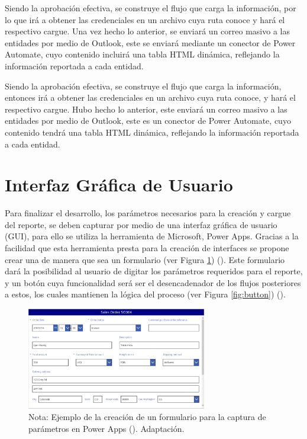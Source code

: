 \documentclass[letter,oneside,12pt,spanish]{report}
\begin{document}
\noindent Siendo la aprobación efectiva, se construye el flujo que carga la información, por lo que irá a obtener las credenciales en un archivo cuya ruta conoce y hará el respectivo cargue. Una vez hecho lo anterior, se enviará un correo masivo a las entidades por medio de Outlook, este se enviará mediante un conector de Power Automate, cuyo contenido incluirá una tabla HTML dinámica, reflejando la información reportada a cada entidad.

\noindent Siendo la aprobación efectiva, se construye el flujo que carga la información, entonces irá a obtener las credenciales en un archivo cuya ruta conoce, y hará el respectivo cargue. Hubo hecho lo anterior, este enviará un correo masivo a las entidades por medio de Outlook, este es un conector de Power Automate, cuyo contenido tendrá una tabla HTML dinámica, reflejando la información reportada a cada entidad. 

\section{Interfaz Gráfica de Usuario}

\noindent Para finalizar el desarrollo, los parámetros necesarios para la creación y cargue del reporte, se deben capturar por medio de una interfaz gráfica de usuario (GUI), para ello se utiliza la herramienta de Microsoft, Power Apps. Gracias a la facilidad que esta herramienta presta para la creación de interfaces se propone crear una de manera que sea un formulario (ver Figura \ref{fig:createapp}) (\cite{tapanm2024powerapps}). Este formulario dará la posibilidad al usuario de digitar los parámetros requeridos para el reporte, y un botón cuya funcionalidad será ser el desencadenador de los flujos posteriores a estos, los cuales mantienen la lógica del proceso (ver Figura \ref{fig:button}) (\cite{tapanm2024powerapps}).

\begin{figure}[ht]
    \centering
    \includegraphics[width=0.7\textwidth]{Figs/creacion app ejemplo.png}
    \label{fig:createapp}
    \\Nota:  Ejemplo de la creación de un formulario para la captura de parámetros en Power Apps (\cite{tapanm2024powerapps}). Adaptación.
\end{figure}
\end{document}

